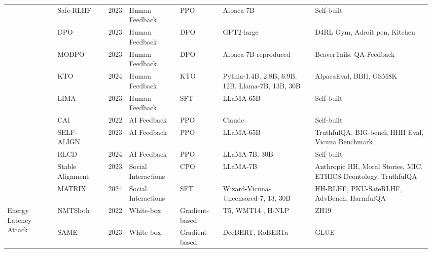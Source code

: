 \begin{table*}[htp]
{\begin{tabular}{p{}p{}p{}p{}p{}p{}p{}}
& Safe-RLHF~\cite{dai2023safe} & 2023 & Human Feedback & PPO & Alpaca-7B & Self-built \\
& \cellcolor{gray!15!}DPO~\cite{an2023direct,rafailov2024direct} & \cellcolor{gray!15!}2023 & \cellcolor{gray!15!}Human Feedback & \cellcolor{gray!15!}DPO & \cellcolor{gray!15!}GPT2-large & \cellcolor{gray!15!}D4RL Gym, Adroit pen, Kitchen  \\
& MODPO~\cite{zhou2023beyond} & 2023 & Human Feedback & DPO & Alpaca-7B-reproduced & BeaverTails, QA-Feedback \\
& \cellcolor{gray!15!}KTO\cite{ethayarajh2024kto} & \cellcolor{gray!15!}2024 & \cellcolor{gray!15!}Human Feedback & \cellcolor{gray!15!}KTO & \cellcolor{gray!15!}Pythia-1.4B, 2.8B, 6.9B, 12B, Llama-7B, 13B, 30B & \cellcolor{gray!15!}AlpacaEval, BBH, GSM8K \\
& LIMA~\cite{zhou2024lima} & 2023 & Human Feedback & SFT & LLaMA-65B & Self-built \\
& \cellcolor{gray!15!}CAI~\cite{bai2022constitutional} & \cellcolor{gray!15!}2022 & \cellcolor{gray!15!}AI Feedback & \cellcolor{gray!15!}PPO & \cellcolor{gray!15!}Claude & \cellcolor{gray!15!}Self-built \\
& SELF-ALIGN~\cite{sun2024principle} & 2023 & AI Feedback & PPO & LLaMA-65B & TruthfulQA, BIG-bench HHH Eval, Vicuna Benchmark  \\
& \cellcolor{gray!15!}RLCD~\cite{yang2024rlcd} & \cellcolor{gray!15!}2024 & \cellcolor{gray!15!}AI Feedback & \cellcolor{gray!15!}PPO &  \cellcolor{gray!15!}LLaMA-7B, 30B & \cellcolor{gray!15!}Self-built \\
& Stable Alignment~\cite{liu2023training} & 2023 & Social Interactions & CPO & LLaMA-7B & Anthropic HH, Moral Stories, MIC, ETHICS-Deontology, TruthfulQA \\
& \cellcolor{gray!15!}MATRIX~\cite{pang2024self} & \cellcolor{gray!15!}2024 & \cellcolor{gray!15!}Social Interactions & \cellcolor{gray!15!}SFT & \cellcolor{gray!15!}Wizard-Vicuna-
Uncensored-7, 13, 30B & \cellcolor{gray!15!}HH-RLHF, PKU-SafeRLHF, AdvBench, HarmfulQA  \\
\hline
\multirow{6}{0.1\textwidth}{Energy Latency Attack} & NMTSloth~\cite{chen2022nmtsloth} & 2022 & White-box & Gradient-based & T5, WMT14 , H-NLP & ZH19 \\
& \cellcolor{gray!15!}SAME~\cite{chen2023dynamic} & \cellcolor{gray!15!}2023 & \cellcolor{gray!15!}White-box & \cellcolor{gray!15!}Gradient-based & \cellcolor{gray!15!}DeeBERT, RoBERTa & \cellcolor{gray!15!}GLUE \\

\end{tabular}}
\end{table*}
